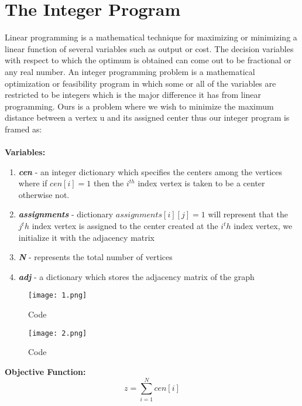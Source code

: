 \documentclass[12pt,a4paper,onecolumn]{article}
\begin{document}
\section{The Integer Program}
Linear programming is a mathematical technique for maximizing or minimizing a linear function of several variables such as output or cost. The decision variables with respect to which the optimum is obtained can come out to be fractional or any real number. An integer programming problem is a mathematical optimization or feasibility program in which
some or all of the variables are restricted to be integers which is the major difference it has from linear programming. Ours is a problem where we
wish to minimize the maximum distance between a vertex u and its assigned center thus our integer program is framed as:
\\\\
\textbf{Variables:}\begin{enumerate}
\item \textit{\textbf{cen}} - an integer dictionary which specifies the centers among the vertices
where if $cen[i]=1$ then the $i^{th}$ index vertex is taken to be a center otherwise not.\item \textit{\textbf{assignments}} - dictionary $assignments[i][j]=1$ will represent that the $j^th$ index vertex is assigned to the center created at the $i^th$ index vertex, we initialize it with the adjacency matrix
\item \textit{\textbf{N}} - represents the total number of vertices
\item \textit{\textbf{adj}} - a dictionary which stores the adjacency matrix of the graph 

\end{enumerate}

\begin{center}

\begin{figure}[H]
 \texttt{[image: 1.png]}
  \caption{Code}
  \label{Figure 2}
\end{figure}

\begin{figure}[H]
 \texttt{[image: 2.png]}
  \caption{Code}
  \label{Figure 3}
\end{figure}
\end{center}
\textbf{Objective Function:}\\
\hspace{15mm} $$z=\sum_{i=1}^{N}cen[i]$$
\end{document}
